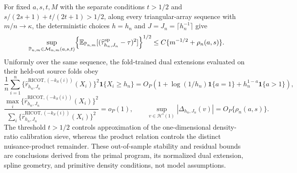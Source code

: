 For fixed \(a,s,t,M\) with the separate conditions \(t>1/2\) and \(s/(2s+1)+t/(2t+1)>1/2\), along every triangular-array sequence with \(m/n\to\kappa\), the deterministic choices \(h=h_n\) and \(J=J_n=\lceil h_n^{-1}\rceil\) give \[\sup_{\mathbb P_{n,m}\in\mathcal M_{n,m}(a,s,t)}\Bigl\{\mathbb E_{\mathbb P_{n,m}}[(\widehat\tau^{\mathrm{sp}}_{h_n,J_n}-\tau)^2]\Bigr\}^{1/2}\le C\{m^{-1/2}+\rho_n(a,s)\}.\] Uniformly over the same sequence, the fold-trained dual extensions evaluated on their held-out source folds obey \[\frac1n\sum_{i=1}^n\{\widehat r^{\mathrm{RICOT},(-k_S(i))}_{h_n,J_n}(X_i)\}^2\mathbf 1\{X_i\ge h_n\}=O_P\!\left(1+\log(1/h_n)\mathbf 1\{a=1\}+h_n^{1-a}\mathbf 1\{a>1\}\right),\] \[\frac{\max_i\{\widehat r^{\mathrm{RICOT},(-k_S(i))}_{h_n,J_n}(X_i)\}^2}{\sum_i\{\widehat r^{\mathrm{RICOT},(-k_S(i))}_{h_n,J_n}(X_i)\}^2}=o_P(1),\qquad \sup_{v\in\mathcal H^s(1)}|\Delta_{h_n,J_n}(v)|=O_P\{\rho_n(a,s)\}.\] The threshold \(t>1/2\) controls approximation of the one-dimensional density-ratio calibration sieve, whereas the product relation controls the distinct nuisance-product remainder. These out-of-sample stability and residual bounds are conclusions derived from the primal program, its normalized dual extension, spline geometry, and primitive density conditions, not model assumptions.